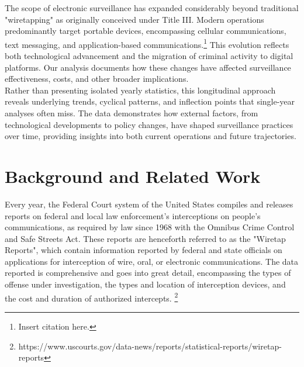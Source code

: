 \documentclass[11pt,twocolumn]{article} %
\begin{document}
\noindent The scope of electronic surveillance has expanded considerably beyond traditional "wiretapping" as originally conceived under Title III. Modern operations predominantly target portable devices, encompassing cellular communications, text messaging, and application-based communications.\footnote{Insert citation here.} This evolution reflects both technological advancement and the migration of criminal activity to digital platforms. Our analysis documents how these changes have affected surveillance effectiveness, costs, and other broader implications.\\

\noindent Rather than presenting isolated yearly statistics, this longitudinal approach reveals underlying trends, cyclical patterns, and inflection points that single-year analyses often miss. The data demonstrates how external factors, from technological developments to policy changes, have shaped surveillance practices over time, providing insights into both current operations and future trajectories.

\section{Background and Related Work}

\noindent Every year, the Federal Court system of the United States compiles and releases reports on federal and local law enforcement's interceptions on people's communications, as required by law since 1968 with the Omnibus Crime Control and Safe Streets Act. These reports are henceforth referred to as the "Wiretap Reports", which contain information reported by federal and state officials on applications for interception of wire, oral, or electronic communications. The data reported is comprehensive and goes into great detail, encompassing the types of offense under investigation, the types and location of interception devices, and the cost and duration of authorized intercepts. \footnote{https://www.uscourts.gov/data-news/reports/statistical-reports/wiretap-reports}\\
\end{document}

